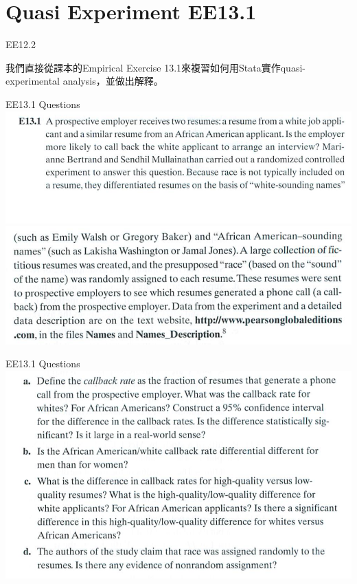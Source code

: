\section{Quasi Experiment EE13.1}




\begin{frame}[fragile]{EE12.2}

我們直接從課本的Empirical Exercise 13.1來複習如何用Stata實作quasi-experimental analysis，並做出解釋。

\end{frame}

\begin{frame}[fragile]{EE13.1 Questions}
\includegraphics[width=1\textwidth]{Images/EE13-1_1.png}
\includegraphics[width=1\textwidth]{Images/EE13-1_2.png}
\end{frame}
\begin{frame}[fragile]{EE13.1 Questions}
\includegraphics[width=1\textwidth]{Images/EE13-1_3.png}
\end{frame}




